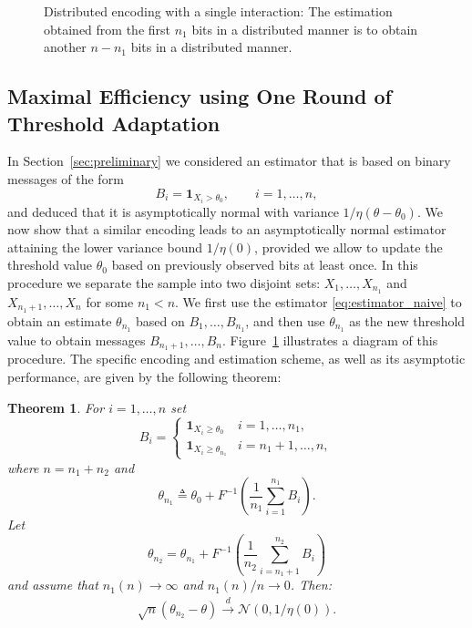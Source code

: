 \documentclass[letterpaper, 11pt]{IEEEtran}      %
\newtheorem{thm}{\bf{Theorem}}
\newcommand{\Ncal}{\mathcal{N}}
\begin{document}
\begin{figure}
\begin{center}
\end{center}
\caption{Distributed encoding with a single interaction: The estimation obtained from the first $n_1$ bits in a distributed manner is to obtain another $n-n_1$ bits in a distributed manner. 
\label{fig:one_round}
}
\end{figure}

\subsection{Maximal Efficiency using One Round of Threshold Adaptation}
In Section~\ref{sec:preliminary} we considered an estimator that is based on binary messages of the form 
\[
B_i = \mathbf 1_{X_i > \theta_0},\qquad i=1,\ldots,n,
\]
and deduced that it is asymptotically normal with variance $1/\eta(\theta-\theta_0)$.
%
We now show that a similar encoding leads to an asymptotically normal estimator attaining the lower variance bound $1/\eta(0)$, provided we allow to  update the threshold value $\theta_0$ based on previously observed bits at least once. 
%
In this procedure we separate the sample into two disjoint sets: $X_1,\ldots,X_{n_1}$ and $X_{n_1+1},\ldots,X_n$ for some $n_1 < n$.
We first use the estimator \eqref{eq:estimator_naive} to obtain an estimate ${\theta}_{n_1}$ based on $B_1,\ldots,B_{n_1}$, and then use ${\theta}_{n_1}$ as the new threshold value to obtain messages $B_{n_1+1}, \ldots, B_n$. Figure~\ref{fig:one_round} illustrates a diagram of this procedure. 
%
The specific encoding and estimation scheme, as well as its asymptotic performance, are given by the following theorem:
\begin{thm}
For $i=1,\ldots,n$ set
\[
B_i = \begin{cases}
 \mathbf 1_{X_i \geq \theta_0} & i = 1,\ldots,n_1, \\
 \mathbf 1_{X_i \geq {\theta}_{n_1} }& i={n_1+1,\ldots,n},
\end{cases}
\]
where $n = n_1+ n_2$ and 
\[
{\theta}_{n_1} \triangleq \theta_0 + F^{-1}\left(
\frac{1}{n_1} \sum_{i=1}^{n_1} B_i 
 \right).
\] 
Let 
\[
{\theta}_{n_2}  = {\theta}_{n_1} +  F^{-1} \left( \frac{1}{n_2} \sum_{i=n_1+1}^{n_2} B_i \right)
\]
and assume that $n_1(n) \rightarrow \infty$ and $n_1(n)/n \rightarrow 0$. Then:
\begin{align*}
 \sqrt{n} \left( {\theta}_{n_2} - \theta  \right) \overset{d}{\longrightarrow}  \Ncal\left( 0, 1/\eta(0) \right).
\end{align*}
\end{thm}
\end{document}
